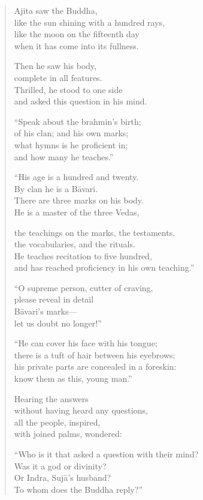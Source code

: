 \documentclass[12pt,openany]{book}%
\begin{document}
\begin{verse}
Ajita saw the Buddha, \\
like the sun shining with a hundred rays, \\
like the moon on the fifteenth day \\
when it has come into its fullness. 

Then he saw his body, \\
complete in all features. \\
Thrilled, he stood to one side \\
and asked this question in his mind. 

“Speak about the brahmin’s birth; \\
of his clan; and his own marks; \\
what hymns is he proficient in; \\
and how many he teaches.” 

“His age is a hundred and twenty. \\
By clan he is a \textsanskrit{Bāvari}. \\
There are three marks on his body. \\
He is a master of the three Vedas, 

the teachings on the marks, the testaments, \\
the vocabularies, and the rituals. \\
He teaches recitation to five hundred, \\
and has reached proficiency in his own teaching.” 

“O supreme person, cutter of craving, \\
please reveal in detail \\
\textsanskrit{Bāvari}’s marks—\\
let us doubt no longer!” 

“He can cover his face with his tongue; \\
there is a tuft of hair between his eyebrows; \\
his private parts are concealed in a foreskin: \\
know them as this, young man.” 

Hearing the answers \\
without having heard any questions, \\
all the people, inspired, \\
with joined palms, wondered: 

“Who is it that asked a question with their mind? \\
Was it a god or divinity? \\
Or Indra, \textsanskrit{Sujā}’s husband? \\
To whom does the Buddha reply?” 


\end{verse}
\end{document}
